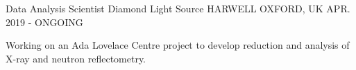 \begin{cventries}
  \cventry
    {Data Analysis Scientist}
    {Diamond Light Source}
    {HARWELL OXFORD, UK}
    {APR. 2019 - ONGOING}
    {
      \begin{cvitems}
        \item {Working on an Ada Lovelace Centre project to develop reduction and analysis of X-ray and neutron reflectometry.}
      \end{cvitems}
    }
\end{cventries}
